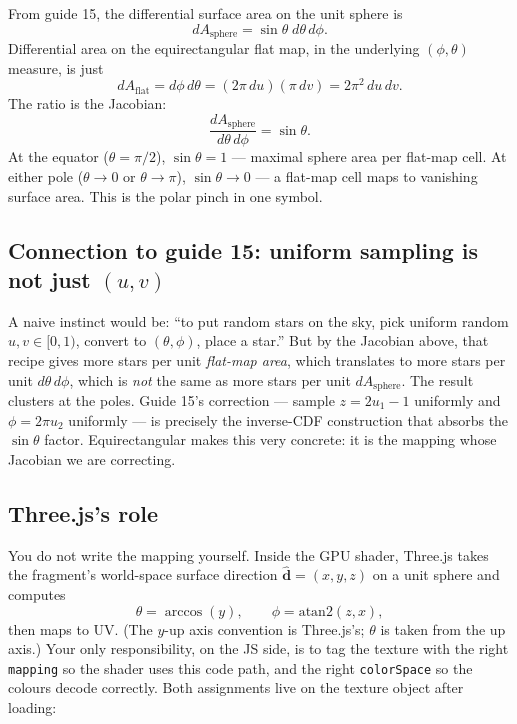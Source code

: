 \documentclass{article}
\begin{document}
From guide 15, the differential surface area on the unit sphere is
\begin{equation}
  dA_{\text{sphere}} = \sin\theta \; d\theta \, d\phi.
\end{equation}
Differential area on the equirectangular flat map, in the underlying
$(\phi, \theta)$ measure, is just
\begin{equation}
  dA_{\text{flat}} = d\phi \, d\theta = (2\pi \, du)(\pi \, dv) = 2\pi^2 \, du \, dv.
\end{equation}
The ratio is the Jacobian:
\begin{equation}
  \boxed{\frac{dA_{\text{sphere}}}{d\theta \, d\phi} = \sin\theta.}
\end{equation}
At the equator ($\theta = \pi/2$), $\sin\theta = 1$ --- maximal sphere area
per flat-map cell. At either pole ($\theta \to 0$ or $\theta \to \pi$),
$\sin\theta \to 0$ --- a flat-map cell maps to vanishing surface area. This
is the polar pinch in one symbol.

\subsection{Connection to guide 15: uniform sampling is not just $(u, v)$}

A naive instinct would be: ``to put random stars on the sky, pick uniform
random $u, v \in [0, 1)$, convert to $(\theta, \phi)$, place a star.'' But by
the Jacobian above, that recipe gives more stars per unit \emph{flat-map
area}, which translates to more stars per unit \emph{$d\theta \, d\phi$},
which is \emph{not} the same as more stars per unit $dA_{\text{sphere}}$. The
result clusters at the poles. Guide 15's correction --- sample
$z = 2u_1 - 1$ uniformly and $\phi = 2\pi u_2$ uniformly --- is precisely the
inverse-CDF construction that absorbs the $\sin\theta$ factor. Equirectangular
makes this very concrete: it is the mapping whose Jacobian we are correcting.

\subsection{Three.js's role}

You do not write the mapping yourself. Inside the GPU shader, Three.js takes
the fragment's world-space surface direction $\hat{\mathbf{d}} = (x, y, z)$
on a unit sphere and computes
\begin{equation}
  \theta = \arccos(y), \qquad \phi = \mathrm{atan2}(z, x),
\end{equation}
then maps to UV. (The $y$-up axis convention is Three.js's; $\theta$ is taken
from the up axis.) Your only responsibility, on the JS side, is to tag the
texture with the right \texttt{mapping} so the shader uses this code path,
and the right \texttt{colorSpace} so the colours decode correctly. Both
assignments live on the texture object after loading:
\end{document}
